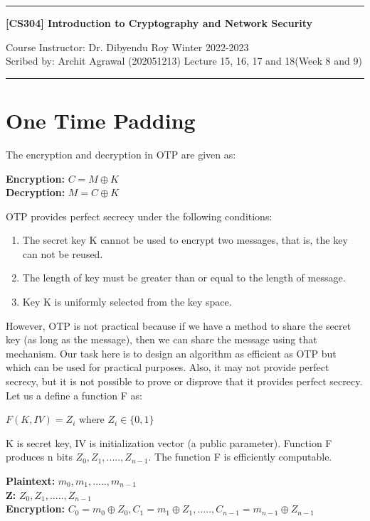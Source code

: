 \documentclass[11pt]{article}
\begin{document}
\noindent
\rule{\textwidth}{1pt}
\begin{center}
{\bf [CS304] Introduction to Cryptography and Network Security}
\end{center}
Course Instructor: Dr. Dibyendu Roy \hfill Winter 2022-2023\\
Scribed by: Archit Agrawal (202051213) \hfill Lecture 15, 16, 17 and 18(Week 8 and 9)
\\
\rule{\textwidth}{1pt}

\section{One Time Padding}
The encryption and decryption in OTP are given as:
\begin{center}
    \textbf{Encryption:} $C = M \oplus K$\\
    \textbf{Decryption:} $M = C \oplus K$\\ 
\end{center}
OTP provides perfect secrecy under the following conditions:
\begin{enumerate}
    \item The secret key K cannot be used to encrypt two messages, that is, the key can not be reused.
    \item The length of key must be greater than or equal to the length of message.
    \item Key K is uniformly selected from the key space.
\end{enumerate}

However, OTP is not practical because if we have a method to share the secret key (as long as the message), then we can share the message using that mechanism. Our task here is to design an algorithm as efficient as OTP but which can be used for practical purposes. Also, it may not provide perfect secrecy, but it is not possible to prove or disprove that it provides perfect secrecy.\\
\vspace{3mm}
Let us a define a function F as:
\begin{center}
    $F(K, IV) = Z_i$ where $Z_i \in \{0, 1\}$
\end{center}
K is secret key, IV is initialization vector (a public parameter). Function F produces n bits $Z_0, Z_1,....., Z_{n-1}$. The function F is efficiently computable.
\begin{center}
    \textbf{Plaintext:} $m_0, m_1,....., m_{n-1}$\\
    \textbf{Z:} $Z_0, Z_1,....., Z_{n-1}$\\
    \textbf{Encryption:} $C_0 = m_0 \oplus Z_0, C_1 = m_1 \oplus Z_1,....., C_{n-1} = m_{n-1} \oplus Z_{n-1}$
\end{center}
\end{document}
